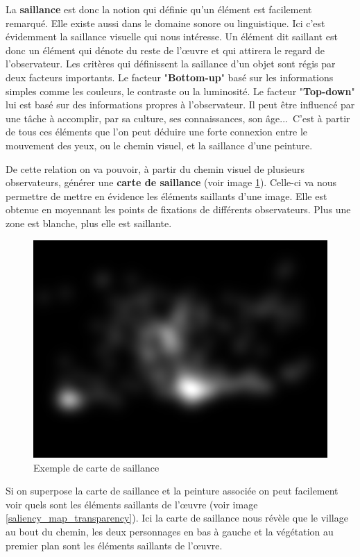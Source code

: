 \par
La \textbf{saillance} est donc la notion qui définie qu'un élément est facilement remarqué. Elle existe aussi dans le domaine sonore ou linguistique. Ici c'est évidemment la saillance visuelle qui nous intéresse. Un élément dit saillant est donc un élément qui dénote du reste de l'\oe{}uvre et qui attirera le regard de l'observateur. Les critères qui définissent la saillance d'un objet sont régis par deux facteurs importants. Le facteur "\textbf{Bottom-up}" basé sur les informations simples comme les couleurs, le contraste ou la luminosité. Le facteur "\textbf{Top-down}" lui est basé sur des informations propres à l'observateur. Il peut être influencé par une tâche à accomplir, par sa culture, ses connaissances, son âge...\ C'est à partir de tous ces éléments que l'on peut déduire une forte connexion entre le mouvement des yeux, ou le chemin visuel, et la saillance d'une peinture.

\par
De cette relation on va pouvoir, à partir du chemin visuel de plusieurs observateurs, générer une \textbf{carte de saillance} (voir image \ref{ex_saliency_map}). Celle-ci va nous permettre de mettre en évidence les éléments saillants d'une image. Elle est obtenue en moyennant les points de fixations de différents observateurs. Plus une zone est blanche, plus elle est saillante.

\begin{figure}[!ht]
    \centering
    \includegraphics[width=0.7\linewidth]{datas/exemple_saliency_map.png}
    \caption{Exemple de carte de saillance}
    \label{ex_saliency_map}
\end{figure}

\par
Si on superpose la carte de saillance et la peinture associée on peut facilement voir quels sont les éléments saillants de l'\oe{}uvre (voir image \ref{saliency_map_transparency}). Ici la carte de saillance nous révèle que le village au bout du chemin, les deux personnages en bas à gauche et la végétation au premier plan sont les éléments saillants de l'\oe{}uvre.

